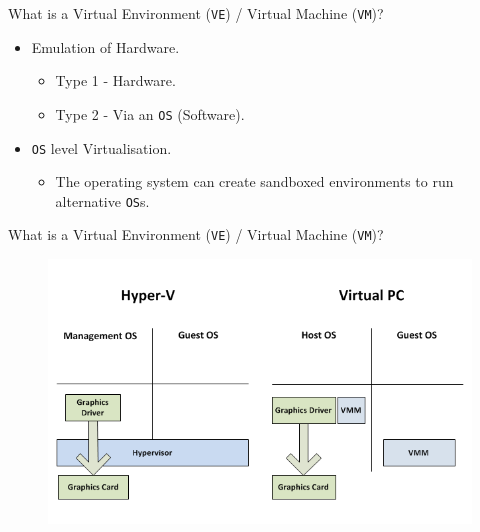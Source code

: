 \documentclass{beamer}
\begin{document}
\begin{frame}{What is a Virtual Environment (\texttt{VE}) / Virtual Machine (\texttt{VM})?}
  \begin{itemize}
    \item Emulation of Hardware.
      \begin{itemize}
        \item Type 1 - Hardware.
        \item Type 2 - Via an \texttt{OS} (Software).
      \end{itemize}  
    \item \texttt{OS} level Virtualisation.
      \begin{itemize}
        \item The operating system can create sandboxed environments to run alternative \texttt{OS}s.
      \end{itemize}
  \end{itemize}
\end{frame}

\begin{frame}{What is a Virtual Environment (\texttt{VE}) / Virtual Machine (\texttt{VM})?}
  \begin{figure}
    \begin{center}
      \includegraphics[width=\linewidth]{Comparison.png}
    \end{center}
  \end{figure}
\end{frame}
\end{document}
